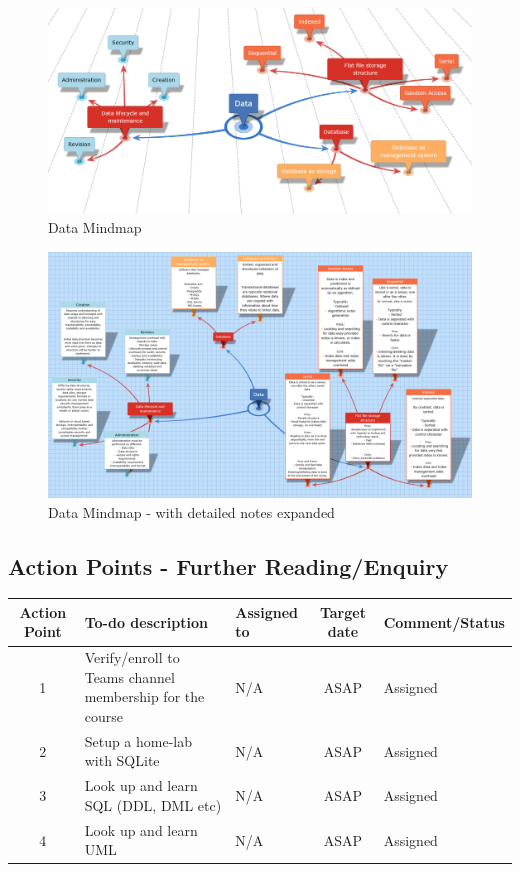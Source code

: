 {\begin{figure}
    \includegraphics[width=\linewidth]{tex/Data_cropped.png}
    \caption{Data Mindmap}
    \label{fig: Data Mindmap}
\end{figure}

\begin{figure}
    \includegraphics[width=\linewidth]{tex/Data_cropped2.png}
    \caption{Data Mindmap - with detailed notes expanded}
    \label{fig:Data Mindmap expanded}
\end{figure}



\subsection{Action Points - Further Reading/Enquiry}

\begin{adjustbox}{max width=\textwidth}
    \begin{tabular}{c|l|l|c|l}
        {\bfseries{Action Point}} & {\bfseries{To-do description}} & {\bfseries{Assigned to}} & {\bfseries{Target date}} & {\bfseries{Comment/Status}} \\
        \hline
        1 & Verify/enroll to Teams channel membership for the course & N/A & ASAP & Assigned \\ \hline
        2 & Setup a home-lab with SQLite & N/A & ASAP & Assigned \\ \hline
        3 & Look up and learn SQL (DDL, DML etc) & N/A & ASAP & Assigned \\ \hline
        4 & Look up and learn UML & N/A & ASAP & Assigned \\ \hline
    \end{tabular}
\end{adjustbox}

}
